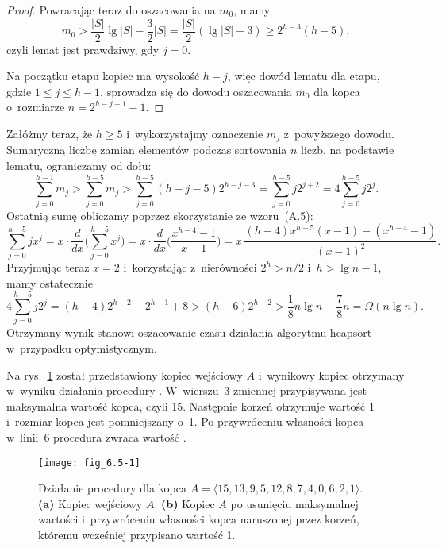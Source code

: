 \begin{proof}
Powracając teraz do oszacowania na $m_0$, mamy
\[
    m_0 > \frac{|S|}{2}\lg|S|-\frac{3}{2}|S| = \frac{|S|}{2}(\lg|S|-3) \ge 2^{h-3}(h-5),
\]
czyli lemat jest prawdziwy, gdy $j=0$.

Na początku  etapu kopiec ma wysokość $h-j$, więc dowód lematu dla  etapu, gdzie $1\le j\le h-1$, sprowadza się do dowodu oszacowania $m_0$ dla kopca o~rozmiarze $n=2^{h-j+1}-1$.
\end{proof}

Załóżmy teraz, że $h\ge5$ i~wykorzystajmy oznaczenie $m_j$ z~powyższego dowodu.
Sumaryczną liczbę zamian elementów podczas sortowania $n$ liczb, na podstawie lematu, ograniczamy od dołu:
\[
    \sum_{j=0}^{h-1}m_j > \sum_{j=0}^{h-5}m_j > \sum_{j=0}^{h-5}(h-j-5)2^{h-j-3} = \sum_{j=0}^{h-5}j2^{j+2} = 4\sum_{j=0}^{h-5}j2^j.
\]
Ostatnią sumę obliczamy poprzez skorzystanie ze wzoru~(A.5):
\[
    \sum_{j=0}^{h-5}jx^j = x\cdot\frac{d}{dx}\biggl(\sum_{j=0}^{h-5}x^j\biggr) = x\cdot\frac{d}{dx}\biggl(\frac{x^{h-4}-1}{x-1}\biggr) = x\,\frac{(h-4)x^{h-5}(x-1)-(x^{h-4}-1)}{(x-1)^2}.
\]
Przyjmując teraz $x=2$ i~korzystając z~nierówności $2^h>n/2$ i~$h>\lg n-1$, mamy ostatecznie
\[
    4\sum_{j=0}^{h-5}j2^j = (h-4)2^{h-2}-2^{h-1}+8 > (h-6)2^{h-2} > \frac{1}{8}n\lg n-\frac{7}{8}n = \Omega(n\lg n).
\]
Otrzymany wynik stanowi oszacowanie czasu działania algorytmu heapsort w~przypadku optymistycznym.


\exercise %
Na rys.~\ref{fig:6.5-1} został przedstawiony kopiec wejściowy $A$ i~wynikowy kopiec otrzymany w~wyniku działania procedury .
W~wierszu~3 zmiennej  przypisywana jest maksymalna wartość kopca, czyli 15.
Następnie korzeń otrzymuje wartość 1 i~rozmiar kopca jest pomniejszany o~1.
Po przywróceniu własności kopca w~linii~6 procedura zwraca wartość .
\begin{figure}[ht]
	\begin{center}
		\texttt{[image: fig\_6.5-1]}
	\end{center}
	\caption{Działanie procedury  dla kopca $A=\langle15,13,9,5,12,8,7,4,0,6,2,1\rangle$.
{\sffamily\bfseries(a)} Kopiec wejściowy $A$.
{\sffamily\bfseries(b)} Kopiec $A$ po usunięciu maksymalnej wartości i~przywróceniu własności kopca naruszonej przez korzeń, któremu wcześniej przypisano wartość 1.} \label{fig:6.5-1}
\end{figure}

